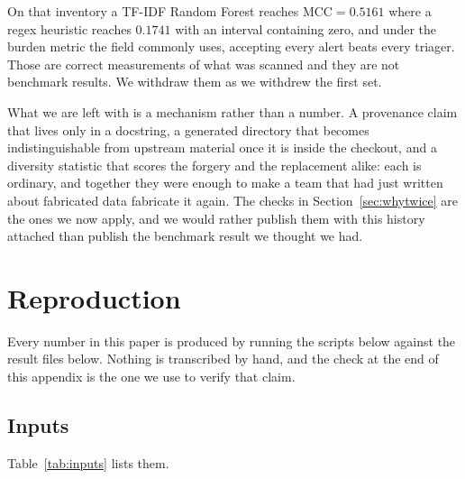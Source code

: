 \documentclass[journal]{IEEEtran}
\theoremstyle{definition}
\newcommand{\RHeurBalMcc}{0.1741}
\newcommand{\RTfidfBalMcc}{0.5161}
\begin{document}
On that inventory a TF-IDF Random Forest reaches
$\mathrm{MCC} = \RTfidfBalMcc$ where a regex heuristic reaches $\RHeurBalMcc$
with an interval containing zero, and under the burden metric the field commonly
uses, accepting every alert beats every triager. Those are correct measurements
of what was scanned and they are not benchmark results. We withdraw them as we
withdrew the first set.

What we are left with is a mechanism rather than a number. A provenance claim
that lives only in a docstring, a generated directory that becomes indistinguishable
from upstream material once it is inside the checkout, and a diversity statistic
that scores the forgery and the replacement alike: each is ordinary, and together
they were enough to make a team that had just written about fabricated data
fabricate it again. The checks in Section~\ref{sec:whytwice} are the ones we now
apply, and we would rather publish them with this history attached than publish
the benchmark result we thought we had.

\appendix

\section{Reproduction}
\label{app:repro}

Every number in this paper is produced by running the scripts below against the
result files below. Nothing is transcribed by hand, and the check at the end of
this appendix is the one we use to verify that claim.

\subsection{Inputs}

Table~\ref{tab:inputs} lists them.
\end{document}
